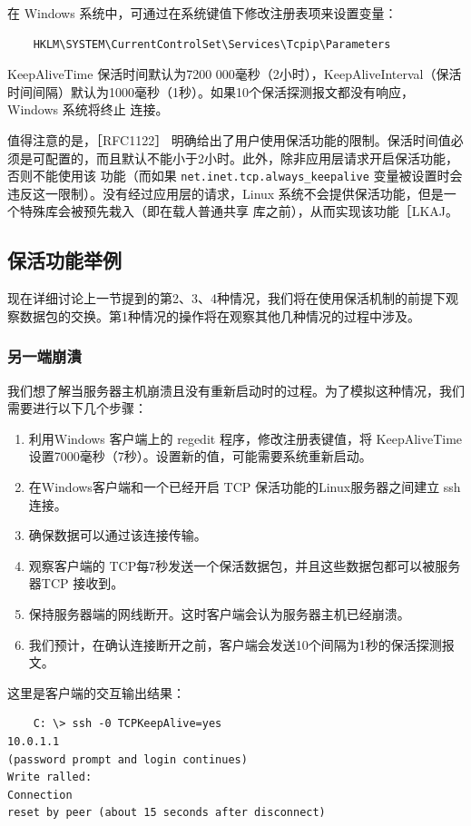 在 Windows 系统中，可通过在系统键值下修改注册表项来设置变量：
\begin{verbatim}
    HKLM\SYSTEM\CurrentControlSet\Services\Tcpip\Parameters
\end{verbatim}

KeepAliveTime 保活时间默认为7200 000毫秒（2小时），KeepAliveInterval（保活时间间隔）默认为1000毫秒（1秒）。如果10个保活探测报文都没有响应，Windows 系统将终止
连接。

值得注意的是，［RFC1122］ 明确给出了用户使用保活功能的限制。保活时间值必须是可配置的，而且默认不能小于2小时。此外，除非应用层请求开启保活功能，否则不能使用该
功能（而如果 \verb|net.inet.tcp.always_keepalive| 变量被设置时会违反这一限制）。没有经过应用层的请求，Linux 系统不会提供保活功能，但是一个特殊库会被预先栽入（即在载人普通共享
库之前），从而实现该功能［LKAJ。

\subsection{保活功能举例}
现在详细讨论上一节提到的第2、3、4种情况，我们将在使用保活机制的前提下观察数据包的交换。第1种情况的操作将在观察其他几种情况的过程中涉及。
\subsubsection{另一端崩潰}
我们想了解当服务器主机崩溃且没有重新启动时的过程。为了模拟这种情况，我们需要进行以下几个步骤：
\begin{enumerate}
    \item 利用Windows 客户端上的 regedit 程序，修改注册表键值，将 KeepAliveTime 设置7000毫秒（7秒）。设置新的值，可能需要系统重新启动。
    \item 在Windows客户端和一个已经开启 TCP 保活功能的Linux服务器之间建立 ssh 连接。
    \item 确保数据可以通过该连接传输。
    \item 观察客户端的 TCP每7秒发送一个保活数据包，并且这些数据包都可以被服务器TCP 接收到。
    \item 保持服务器端的网线断开。这时客户端会认为服务器主机已经崩溃。
    \item 我们预计，在确认连接断开之前，客户端会发送10个间隔为1秒的保活探测报文。
\end{enumerate}

这里是客户端的交互输出结果：
\begin{verbatim}
    C: \> ssh -0 TCPKeepAlive=yes
10.0.1.1
(password prompt and login continues)
Write ralled:
Connection
reset by peer (about 15 seconds after disconnect)
\end{verbatim}


